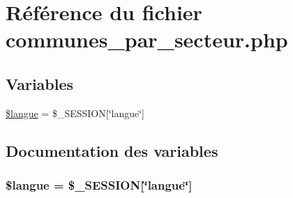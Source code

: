 \hypertarget{communes__par__secteur_8php}{
\section{R\'{e}f\'{e}rence du fichier communes\_\-par\_\-secteur.php}
\label{communes__par__secteur_8php}
}
\subsection*{Variables}
\begin{CompactItemize}
\item 
\hyperlink{communes__par__secteur_8php_a0}{\$langue} = \$\_\-SESSION\mbox{[}\char`\"{}langue\char`\"{}\mbox{]}
\end{CompactItemize}


\subsection{Documentation des variables}
\hypertarget{communes__par__secteur_8php_a0}{
\subsubsection[\$langue]{\setlength{\rightskip}{0pt plus 5cm}\$langue = \$\_\-SESSION\mbox{[}\char`\"{}langue\char`\"{}\mbox{]}}}
\label{communes__par__secteur_8php_a0}


